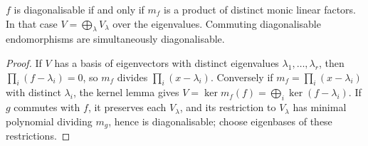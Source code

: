 \begin{theorem}\label{linear-algebra:theorem-diagonalisable}
$f$ is diagonalisable if and only if $m_f$ is a product of distinct monic linear factors. In that case
$V = \bigoplus_\lambda V_\lambda$ over the eigenvalues. Commuting diagonalisable endomorphisms are
simultaneously diagonalisable.
\end{theorem}

\begin{proof}
If $V$ has a basis of eigenvectors with distinct eigenvalues $\lambda_1, \ldots, \lambda_r$, then
$\prod_i (f - \lambda_i) = 0$, so $m_f$ divides $\prod_i (x - \lambda_i)$. Conversely if
$m_f = \prod_i (x - \lambda_i)$ with distinct $\lambda_i$, the kernel lemma gives
$V = \ker m_f(f) = \bigoplus_i \ker(f - \lambda_i)$. If $g$ commutes with $f$, it preserves each $V_\lambda$, and its
restriction to $V_\lambda$ has minimal polynomial dividing $m_g$, hence is diagonalisable; choose
eigenbases of these restrictions.
\end{proof}

